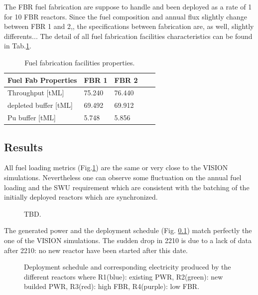\documentclass[12pt]{article}
\begin{document}
The FBR fuel fabrication are suppose to handle and
been deployed as a rate of 1 for 10 FBR reactors.
Since the fuel composition and annual flux
slightly change between FBR 1 and 2,, the
specifications between fabrication are, as well,
slightly differents... The detail of all fuel
fabrication facilities characteristics can be
found in Tab.\ref{tab:fuelfab_1}.

\begin{table}[h!]
\centering
\begin{tabular}{lllll}
\hline
Fuel Fab Properties	&	FBR 1	&	FBR 2	\\
\hline
Throughput [tML]	&	75.240	&	76.440	\\
depleted buffer [tML]	&	69.492	&	69.912	\\
Pu buffer  [tML]		&	5.748	&	5.856	\\
\hline
\end{tabular}
\caption{Fuel fabrication facilities properties.}
\label{tab:fuelfab_1}
\end{table}


\subsection{Results}
All fuel loading metrics
(Fig.\ref{fig:RessourceUsed}) are the same or very
close to the VISION simulations. Nevertheless one
can observe some fluctuation on the annual fuel
loading and the SWU requirement which are
consistent with the batching of the initially
deployed reactors which are synchronized.

\begin{figure}[h!]
\centering
{}
\caption{TBD.\label{fig:RessourceUsed} }
\end{figure}

The generated power and the deployment schedule
(Fig. \ref{})  match perfectly the one of the
VISION simulations. The sudden drop in 2210 is
due to a lack of data after 2210: no new reactor
have been started after this date.\\

\begin{figure}[h!]
\centering
{}
\caption{Deployment schedule and corresponding
electricity produced by the different reactors
where R1(blue): existing PWR, R2(green): new
builded PWR, R3(red): high FBR, R4(purple): low
FBR.\label{fig:deployment_bis} }
\end{figure}
\end{document}
